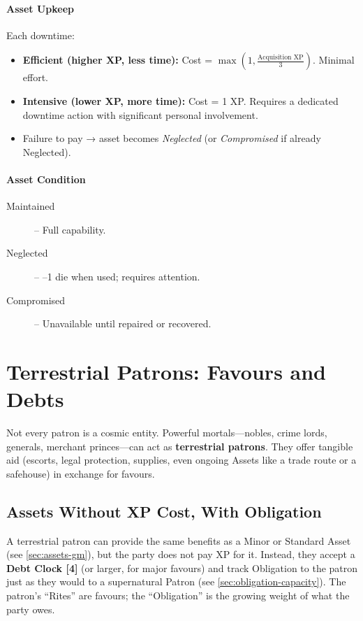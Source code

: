 \paragraph{Asset Upkeep}
Each downtime:
\begin{itemize}
  \item \textbf{Efficient (higher XP, less time):} Cost = \(\max(1, \frac{\text{Acquisition XP}}{3})\). Minimal effort.
  \item \textbf{Intensive (lower XP, more time):} Cost = 1 XP. Requires a dedicated downtime action with significant personal involvement.
  \item Failure to pay → asset becomes \textit{Neglected} (or \textit{Compromised} if already Neglected).
\end{itemize}

\paragraph{Asset Condition}
\begin{description}
  \item[Maintained] – Full capability.
  \item[Neglected] – –1 die when used; requires attention.
  \item[Compromised] – Unavailable until repaired or recovered.
\end{description}

\section{Terrestrial Patrons: Favours and Debts}
\label{sec:terrestrial-patrons}

Not every patron is a cosmic entity. Powerful mortals—nobles, crime lords, generals, merchant princes—can act as \textbf{terrestrial patrons}. They offer tangible aid (escorts, legal protection, supplies, even ongoing Assets like a trade route or a safehouse) in exchange for favours.

\subsection*{Assets Without XP Cost, With Obligation}
A terrestrial patron can provide the same benefits as a Minor or Standard Asset (see \ref{sec:assets-gm}), but the party does not pay XP for it. Instead, they accept a \textbf{Debt Clock [4]} (or larger, for major favours) and track Obligation to the patron just as they would to a supernatural Patron (see \ref{sec:obligation-capacity}). The patron’s “Rites” are favours; the “Obligation” is the growing weight of what the party owes.

